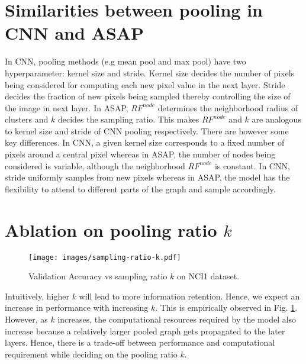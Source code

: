 \documentclass[letterpaper]{article} \usepackage{aaai20}  \usepackage{times}  \usepackage{helvet} \usepackage{courier}  \usepackage[hyphens]{url}  \usepackage{graphicx} \urlstyle{rm} \def\UrlFont{\rm}  \usepackage{graphicx}  \frenchspacing  \setlength{\pdfpagewidth}{8.5in}  \setlength{\pdfpageheight}{11in}
\begin{document}
	\section{Similarities between pooling in CNN and ASAP}
	\label{ssec:cnn-asap}
In CNN, pooling methods (e.g mean pool and max pool) have two hyperparameter: kernel size and stride. Kernel size decides the number of pixels being considered for computing each new pixel value in the next layer. Stride decides the fraction of new pixels being sampled thereby controlling the size of the image in next layer. In ASAP, $RF^{node}$ determines the neighborhood radius of clusters and $k$ decides the sampling ratio. This makes $RF^{node}$ and $k$ are analogous to kernel size and stride of CNN pooling respectively. There are however some key differences. In CNN, a given kernel size corresponds to a fixed number of pixels around a central pixel whereas in ASAP, the number of nodes being considered is variable, although the neighborhood $RF^{node}$ is constant. In CNN, stride uniformly samples from new pixels whereas in ASAP, the model has the flexibility to attend to different parts of the graph and sample accordingly.
	
	
	\section{Ablation on pooling ratio $k$}
	\label{ssec:ablation-k}
	
	\begin{figure}[!ht]
		\centering
		\texttt{[image: images/sampling-ratio-k.pdf]}
		\caption{\label{fig:sampling-ratio-k} Validation Accuracy vs sampling ratio $k$ on NCI1 dataset.}
	\end{figure}
	
	Intuitively, higher $k$ will lead to more information retention. Hence, we expect an increase in performance with increasing $k$. This is empirically observed in Fig. \ref{fig:sampling-ratio-k}. However, as $k$ increases, the computational resources required by the model also increase because a relatively larger pooled graph gets propagated to the later layers. Hence, there is a trade-off between performance and computational requirement while deciding on the pooling ratio $k$.
	
	
\end{document}
